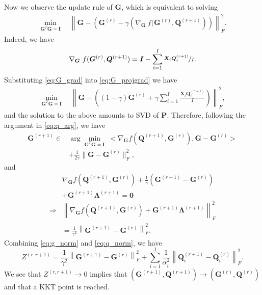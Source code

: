 \documentclass[10pt,journal]{IEEEtran}
\newcommand{\G}{\boldsymbol{G}}
\newcommand{\Q}{\boldsymbol{Q}}
\newcommand{\X}{\boldsymbol{X}}
\begin{document}
Now we observe the update rule of $\G$, which is equivalent to solving
\begin{equation}\label{eq:G_projgrad}
\begin{aligned}
\min_{\G^T\G=\bm I}\quad \left\|\G - \left(\G^{(r)} -\gamma \left(\nabla_{\G}~f(\G^{(r)},\Q^{(r+1)}\right)\right)\right\|_F^2.
\end{aligned}
\end{equation}
Indeed, we have
\begin{equation}\label{eq:G_grad}
\nabla_{\G}~f(\G^{(r)},\Q^{(r+1)} )= {\bm I} -\sum_{i=1}^I\nicefrac{ \X_i\Q_i^{(r+1)}}{I}.
\end{equation}
Substituting \eqref{eq:G_grad} into \eqref{eq:G_projgrad} we have
\begin{equation}\label{eq:G_P}
\begin{aligned}
\min_{\G^T\G=\bm I}\quad \left\|\G - \left((1-\gamma)\G^{(r)}+ \gamma\sum_{i=1}^I \frac{ \X_i\Q_i^{(r+1)}}{I}\right)\right\|_F^2,
\end{aligned}
\end{equation}
and the solution to the above amounts to SVD of $\bm P$.
Therefore, following the argument in \eqref{eq:q_arg}, we have
\begin{equation}\label{eq:g_arg}
\begin{aligned}
\G^{(r+1)} \in& \arg\min_{\G^T\G={\bm I}}~ <\nabla_{\G}f(\Q^{(r+1)},\G^{(r)}),\G -\G^{(r)}>\\ &+\frac{1}{2\gamma}\|\G-\G^{(r)}\|_F^2,
\end{aligned}
\end{equation}
and
\begin{align}
&\nabla_{\G}f(\Q^{(r+1)},\G^{(r)}) +\frac{1}{\gamma}\left(\G^{(r+1)} -\G^{(r)}\right) \nonumber\\
&+ \G^{(r+1)}{\bm\Lambda}^{(r+1)}={\bm 0} \nonumber\\
\Rightarrow& \left\|\nabla_{\G}f(\Q^{(r+1)},\G^{(r)})+\G^{(r+1)}{\bm \Lambda}^{(r+1)}\right\|_F^2 \nonumber\\& = \frac{1}{\gamma^2}  \left\|\G^{(r+1)} -\G^{(r)}\right\|_F^2. \label{eq:g_norm}
\end{align}
Combining \eqref{eq:g_norm} and \eqref{eq:q_norm}, we have
\begin{equation}
Z^{(r,r+1)} = \frac{1}{\gamma^2}  \left\|\G^{(r+1)} -\G^{(r)}\right\|_F^2 + \sum_{i=1}^I\frac{1}{\alpha_i^2}\left\|\Q_i^{(r+1)}-\Q_i^{(r)}\right\|_F^2.
\end{equation}
We see that $Z^{(r,r+1)}\rightarrow 0$ implies that $(\G^{(r+1)},\Q^{(r+1)})\rightarrow (\G^{(r)},\Q^{(r)})$ and that a KKT point is reached.
\end{document}
